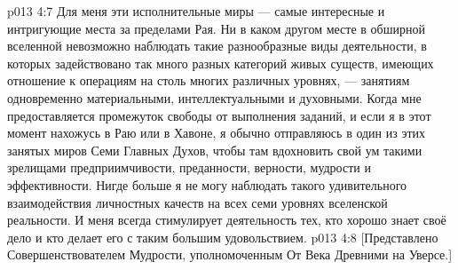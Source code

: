 \vs p013 4:7 Для меня эти исполнительные миры --- самые интересные и интригующие места за пределами Рая. Ни в каком другом месте в обширной вселенной невозможно наблюдать такие разнообразные виды деятельности, в которых задействовано так много разных категорий живых существ, имеющих отношение к операциям на столь многих различных уровнях, --- занятиям одновременно материальными, интеллектуальными и духовными. Когда мне предоставляется промежуток свободы от выполнения заданий, и если я в этот момент нахожусь в Раю или в Хавоне, я обычно отправляюсь в один из этих занятых миров Семи Главных Духов, чтобы там вдохновить свой ум такими зрелищами предприимчивости, преданности, верности, мудрости и эффективности. Нигде больше я не могу наблюдать такого удивительного взаимодействия личностных качеств на всех семи уровнях вселенской реальности. И меня всегда стимулирует деятельность тех, кто хорошо знает своё дело и кто делает его с таким большим удовольствием.
\vsetoff
\vs p013 4:8 [Представлено Совершенствователем Мудрости, уполномоченным От Века Древними на Уверсе.]
\quizlink
